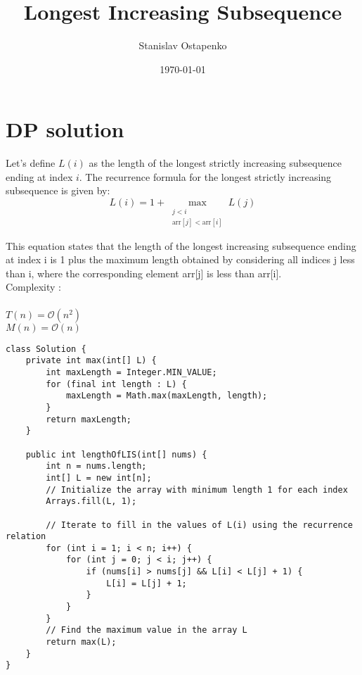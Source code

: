 \documentclass[11pt]{article}
\begin{document}
    \title{Longest Increasing Subsequence}
    \author{Stanislav Ostapenko}
    \date{\today}
    \maketitle

    \section*{DP solution}
    Let's define $L(i)$ as the length of the longest strictly increasing subsequence ending at index $i$.
    The recurrence formula for the longest strictly increasing subsequence is given by:
    \[ L(i) = 1 + \max_{\substack{j < i \\ \text{arr}[j] < \text{arr}[i]}} L(j) \]

	This equation states that the length of the longest increasing subsequence ending at index i is 1 plus the maximum length obtained by considering all indices j less than i, where the corresponding element arr[j] is less than arr[i].
\\

\noindent
Complexity :\\ 
\\
\noindent
$T(n) = \mathcal{O}(n^{2})$
\\
$M(n) = \mathcal{O}(n)$

\begin{lstlisting}
class Solution {
	private int max(int[] L) {
		int maxLength = Integer.MIN_VALUE;
		for (final int length : L) {
			maxLength = Math.max(maxLength, length);
		}
		return maxLength;
	}
	
	public int lengthOfLIS(int[] nums) {
		int n = nums.length;
		int[] L = new int[n];
		// Initialize the array with minimum length 1 for each index
		Arrays.fill(L, 1);
		
		// Iterate to fill in the values of L(i) using the recurrence relation
		for (int i = 1; i < n; i++) {
			for (int j = 0; j < i; j++) {
				if (nums[i] > nums[j] && L[i] < L[j] + 1) {
					L[i] = L[j] + 1;
				}
			}
		}
		// Find the maximum value in the array L
		return max(L);
	}
}
\end{lstlisting}
\end{document}

